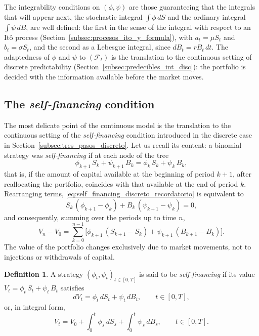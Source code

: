 \documentclass[11pt,a4paper,oneside]{report}
\theoremstyle{plain}
\theoremstyle{definition}
\newtheorem{definicion}[teorema]{Definition}
\theoremstyle{remark}
\newcommand{\F}{\mathcal{F}}
\newcommand{\1}{\mathbf{1}}
\begin{document}
The integrability conditions on $(\phi, \psi)$ are those guaranteeing
that the integrals that will appear next, the stochastic integral
$\int \phi\, dS$ and the ordinary integral $\int \psi\, dB$, are well
defined: the first in the sense of the integral with respect to an Itô process (Section~\ref{subsec:procesos_ito_y_formula}), with $a_t = \mu S_t$ and $b_t = \sigma S_t$, and the second as a Lebesgue integral, since $dB_t = r B_t\, dt$. The
adaptedness of $\phi$ and $\psi$ to $(\F_t)$ is the translation to
the continuous setting of discrete predictability
(Section~\ref{subsec:predecibles_int_disc}): the portfolio is decided
with the information available before the market moves.

\subsection{The \emph{self-financing} condition}
\label{subsec:self_financing_continuo}

The most delicate point of the continuous model is the
translation to the continuous setting of the \emph{self-financing}
condition introduced in the discrete case in
Section~\ref{subsec:tres_pasos_discreto}. Let us recall its content:
a binomial strategy was \emph{self-financing} if at each node of the
tree
\begin{equation}\label{eq:self_financing_discreto_recordatorio}
  \phi_{k+1}\, S_k + \psi_{k+1}\, B_k = \phi_k\, S_k + \psi_k\, B_k,
\end{equation}
that is, if the amount of capital available at the beginning of
period $k+1$, after reallocating the portfolio, coincides with that
available at the end of period $k$. Rearranging terms,
\eqref{eq:self_financing_discreto_recordatorio} is equivalent to
\begin{equation*}
  S_k\, (\phi_{k+1} - \phi_k) + B_k\, (\psi_{k+1} - \psi_k) = 0,
\end{equation*}
and consequently, summing over the periods up to time $n$,
\begin{equation*}
  V_n - V_0
  = \sum_{k=0}^{n-1} \bigl[\phi_{k+1}\, (S_{k+1} - S_k)
                            + \psi_{k+1}\, (B_{k+1} - B_k)\bigr].
\end{equation*}
The value of the portfolio changes exclusively due to market
movements, not to injections or withdrawals of capital.

\medskip

\begin{definicion}
\label{def:self_financing_continuo}
A strategy $(\phi_t, \psi_t)_{t \in [0, T]}$ is said to be
\emph{self-financing} if its value $V_t = \phi_t\, S_t + \psi_t\, B_t$
satisfies
\begin{equation}\label{eq:self_financing_continuo}
  dV_t = \phi_t\, dS_t + \psi_t\, dB_t,
  \qquad t \in [0, T],
\end{equation}
or, in integral form,
\begin{equation}\label{eq:self_financing_integral}
  V_t = V_0 + \int_0^t \phi_s\, dS_s + \int_0^t \psi_s\, dB_s,
  \qquad t \in [0, T].
\end{equation}
\end{definicion}
\end{document}
